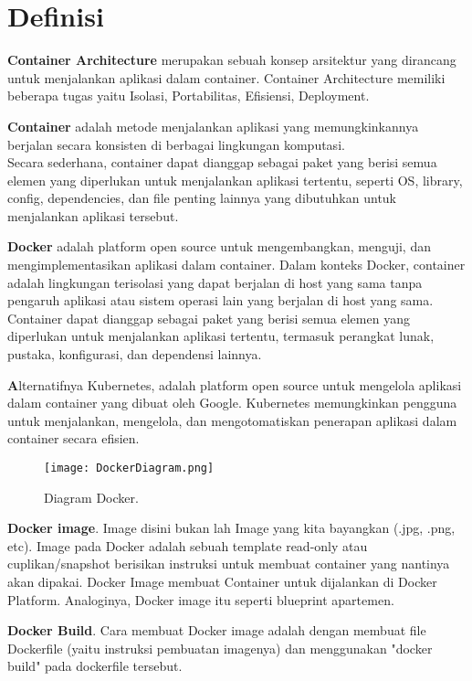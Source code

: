 \section{Definisi}

\textbf{Container Architecture} merupakan sebuah konsep arsitektur yang dirancang untuk menjalankan aplikasi dalam container. Container Architecture memiliki beberapa tugas yaitu Isolasi, Portabilitas, Efisiensi, Deployment.

\textbf{Container} adalah metode menjalankan aplikasi yang memungkinkannya berjalan secara konsisten di berbagai lingkungan komputasi.\\ 
Secara sederhana, container dapat dianggap sebagai paket yang berisi semua elemen yang diperlukan untuk menjalankan aplikasi tertentu, seperti OS, library, config, dependencies, dan file penting lainnya yang dibutuhkan untuk menjalankan aplikasi tersebut.

\textbf{Docker} adalah platform open source untuk mengembangkan, menguji, dan mengimplementasikan aplikasi dalam container. 
Dalam konteks Docker, container adalah lingkungan terisolasi yang dapat berjalan di host yang sama tanpa pengaruh aplikasi atau sistem operasi lain yang berjalan di host yang sama. Container dapat dianggap sebagai paket yang berisi semua elemen yang diperlukan untuk menjalankan aplikasi tertentu, termasuk perangkat lunak, pustaka, konfigurasi, dan dependensi lainnya.

\textbf Alternatifnya {Kubernetes}, adalah platform open source untuk mengelola aplikasi dalam container yang dibuat oleh Google. Kubernetes memungkinkan pengguna untuk menjalankan, mengelola, dan mengotomatiskan penerapan aplikasi dalam container secara efisien.

\begin{figure}[h]
    \centering
    \texttt{[image: DockerDiagram.png]}
    \caption{Diagram Docker.}
    \label{fig:ContainerDiagram2}
\end{figure}

\textbf{Docker image}. Image disini bukan lah Image yang kita bayangkan (.jpg, .png, etc). Image pada Docker adalah sebuah template read-only atau cuplikan/snapshot berisikan instruksi untuk membuat container yang nantinya akan dipakai. Docker Image membuat Container untuk dijalankan di Docker Platform. Analoginya, Docker image itu seperti blueprint apartemen. 

\textbf{Docker Build}. Cara membuat Docker image adalah dengan membuat file Dockerfile (yaitu instruksi pembuatan imagenya) dan menggunakan "docker build" pada dockerfile tersebut. 

